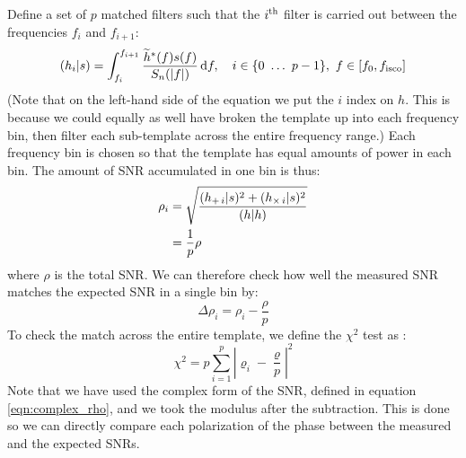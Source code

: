 Define a set of $p$ matched filters such that the $i^{\mathrm{th}}$ filter is carried out between the frequencies $f_i$ and $f_{i+1}$:
\begin{equation}
(h_i|s) = \int_{f_i}^{f_{i+1}} \frac{ \widetilde{h}^{*}(f) s(f) }{S_n(|f|)} \,\mathrm{d} f, \quad i \in \{0~ \ldots~ p-1\},~ f \in \left[ f_0, f_{\mathrm{isco}} \right]
\end{equation}
(Note that on the left-hand side of the equation we put the $i$ index on $h$. This is because we could equally as well have broken the template up into each frequency bin, then filter each sub-template across the entire frequency range.) Each frequency bin is chosen so that the template has equal amounts of power in each bin. The amount of \ac{SNR} accumulated in one bin is thus:
\begin{align}
\rho_i &= \sqrt{\frac{(h_{+ \,i}|s)^2 + (h_{\times \,i}|s)^2}{(h|h)}} \nonumber \\
 &= \frac{1}{p} \rho
\end{align}
where $\rho$ is the total \ac{SNR}. We can therefore check how well the measured \ac{SNR} matches the expected \ac{SNR} in a single bin by:
\begin{equation*}
\Delta \rho_i = \rho_i - \frac{\rho}{p}
\end{equation*}
To check the match across the entire template, we define the $\chi^2$ test as \cite{Allen:2004}:
\begin{equation}
\label{eqn:basic_chisq}
\chi^2 = p \sum_{i=1}^{p} \left|\varrho_i - \frac{\varrho}{p}\right|^2
\end{equation}
Note that we have used the complex form of the \ac{SNR}, defined in equation \ref{eqn:complex_rho}, and we took the modulus after the subtraction. This is done so we can directly compare each polarization of the phase between the measured and the expected \acp{SNR}.

